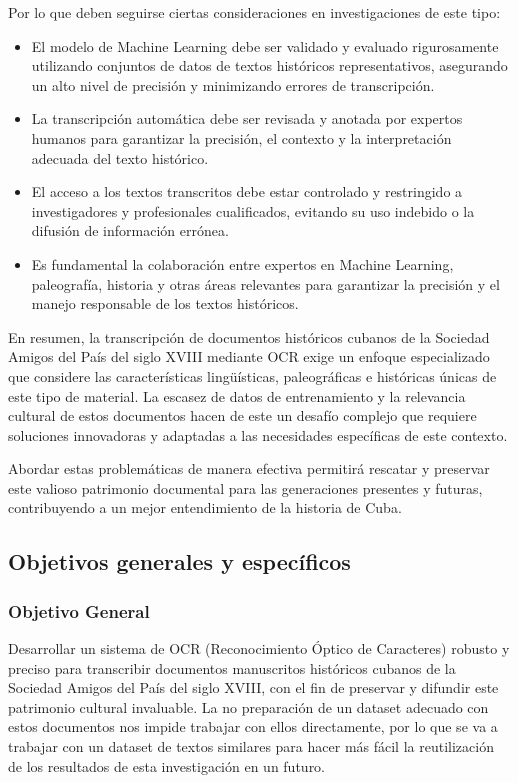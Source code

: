 \documentclass{article}
\begin{document}
Por lo que deben seguirse ciertas consideraciones en investigaciones de este tipo:

\begin{itemize}
    \item El modelo de Machine Learning debe ser validado y evaluado rigurosamente utilizando conjuntos de datos de textos históricos representativos, asegurando un alto nivel de precisión y minimizando errores de transcripción.

    \item La transcripción automática debe ser revisada y anotada por expertos humanos para garantizar la precisión, el contexto y la interpretación adecuada del texto histórico.

    \item  El acceso a los textos transcritos debe estar controlado y restringido a investigadores y profesionales cualificados, evitando su uso indebido o la difusión de información errónea.

    \item Es fundamental la colaboración entre expertos en Machine Learning, paleografía, historia y otras áreas relevantes para garantizar la precisión y el manejo responsable de los textos históricos. \\[10pt]
\end{itemize} 



En resumen, la transcripción de documentos históricos cubanos de la Sociedad Amigos del País del siglo XVIII mediante OCR exige un enfoque especializado que considere las características lingüísticas, paleográficas e históricas únicas de este tipo de material. La escasez de datos de entrenamiento y la relevancia cultural de estos documentos hacen de este un desafío complejo que requiere soluciones innovadoras y adaptadas a las necesidades específicas de este contexto.

Abordar estas problemáticas de manera efectiva permitirá rescatar y preservar este valioso patrimonio documental para las generaciones presentes y futuras, contribuyendo a un mejor entendimiento de la historia de Cuba.

\newpage
\subsection{Objetivos generales y específicos}
\subsubsection{Objetivo General}
Desarrollar un sistema de OCR (Reconocimiento Óptico de Caracteres) robusto y preciso para transcribir documentos manuscritos históricos cubanos de la Sociedad Amigos del País del siglo XVIII, con el fin de preservar y difundir este patrimonio cultural invaluable. La no preparación de un dataset adecuado con estos documentos nos impide trabajar con ellos directamente, por lo que se va a trabajar con un dataset de textos similares para hacer más fácil la reutilización de los resultados de esta investigación en un futuro.
\end{document}
